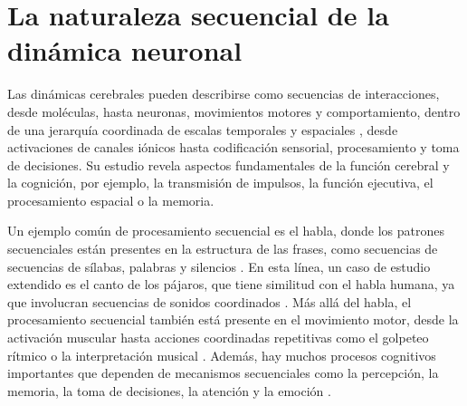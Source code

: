 \section{La naturaleza secuencial de la dinámica neuronal}

Las dinámicas cerebrales pueden describirse como secuencias de interacciones, desde moléculas, hasta neuronas, movimientos motores y comportamiento, dentro de una jerarquía coordinada de escalas temporales y espaciales \parencite{kiebel_hierarchy_2008,yuste05,rabinovich_discrete_2018,Rabinovich23}, desde activaciones de canales iónicos hasta codificación sensorial, procesamiento y toma de decisiones. Su estudio revela aspectos fundamentales de la función cerebral y la cognición, por ejemplo, la transmisión de impulsos, la función ejecutiva, el procesamiento espacial o la memoria.

Un ejemplo común de procesamiento secuencial es el habla, donde los patrones secuenciales están presentes en la estructura de las frases, como secuencias de secuencias de sílabas, palabras y silencios \parencite{kiebel_recognizing_2009}. En esta línea, un caso de estudio extendido es el canto de los pájaros, que tiene similitud con el habla humana, ya que involucran secuencias de sonidos coordinados \parencite{prather_brains_2017,fishbein_sound_2019}. Más allá del habla, el procesamiento secuencial también está presente en el movimiento motor, desde la activación muscular hasta acciones coordinadas repetitivas como el golpeteo rítmico o la interpretación musical \parencite{ding_temporal_2017}. Además, hay muchos procesos cognitivos importantes que dependen de mecanismos secuenciales como la percepción, la memoria, la toma de decisiones, la atención y la emoción \parencite{Varona2016, he_robust_2018, rabinovich_sequential_2020}.

